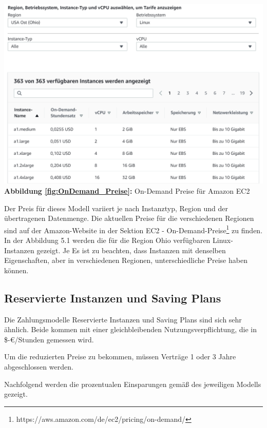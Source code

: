 \begin{center}
    \includegraphics[scale=0.4]{sources/On-Demand-Pläne für Amazon EC2}\label{fig:OnDemand_Preise}\\
    \textbf{Abbildung \autoref{fig:OnDemand_Preise}:} On-Demand Preise für Amazon EC2
        {\cite{AMZ02}}
\end{center}
Der Preis für dieses Modell variiert je nach Instanztyp, Region und der übertragenen Datenmenge. 
Die aktuellen Preise für die verschiedenen Regionen sind auf der Amazon-Website in der Sektion EC2 - On-Demand-Preise\footnote{https://aws.amazon.com/de/ec2/pricing/on-demand/} zu finden.
In der Abbildung 5.1 werden die für die Region Ohio verfügbaren Linux-Instanzen gezeigt. Je Es ist zu beachten, dass Instanzen mit denselben Eigenschaften, aber in verschiedenen Regionen, unterschiedliche Preise haben können.

\subsection{Reservierte Instanzen und Saving Plans}
\begin{flushleft}
    Die Zahlungsmodelle Reservierte Instanzen und Saving Plans sind sich sehr ähnlich. Beide kommen mit einer gleichbleibenden  Nutzungsverpflichtung, die in \$-€/Stunden gemessen wird.

    Um die reduzierten Preise  zu bekommen, müssen Verträge 1 oder 3 Jahre abgeschlossen werden.

    Nachfolgend werden die prozentualen Einsparungen gemäß des jeweiligen Modells gezeigt.
\end{flushleft}

